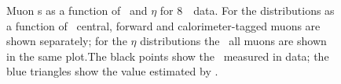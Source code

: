 \begin{figure}[h]
\centering
\vspace{-8mm}
    \caption[Muon \FakeFactor s as a function of \pt\ and $\eta$ for 8~\tev\ data.]
    {Muon \FakeFactor s as a function of \pt\ and $\eta$ for 8~\tev\ data. 
    For the distributions as a function of \pt\, central, forward and calorimeter-tagged muons are shown
    separately; for the $\eta$ distributions the \ffactor\ all muons are
    shown in the same plot.The black points show the \ffactor\ measured in
    data; the blue triangles show the value estimated by \mc.}
\label{fig:ff-mu-eight} 
\end{figure}

